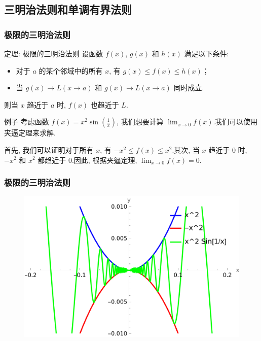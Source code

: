 \documentclass[
10pt,  
aspectratio=43,  
]{beamer}
\begin{document}
\subsection{三明治法则和单调有界法则}

\begin{frame}
	\frametitle{极限的三明治法则}
	
	\begin{block}{定理: 极限的三明治法则}
		设函数 $f(x)$,   $g(x)$ 和 $h(x)$ 满足以下条件: 
		\begin{itemize}
			\item 对于 $a$ 的某个邻域中的所有 $x$,  有 $g(x) \leq f(x) \leq h(x)$；
			\item 当 $g(x)\to L$$(x\to a)$ 和 $g(x)\to L$$(x\to a)$ 同时成立.
		\end{itemize}
		则当 $x$ 趋近于 $a$ 时,  $f(x)$ 也趋近于 $L$.
	\end{block}
	
	\begin{exampleblock}{例子}
		考虑函数 $f(x) = x^2 \sin\left(\frac{1}{x}\right)$,  我们想要计算 $\lim_{x \to 0} f(x)$.我们可以使用夹逼定理来求解.
		
		首先,  我们可以证明对于所有 $x$,  有 $-x^2 \leq f(x) \leq x^2$.其次,  当 $x$ 趋近于 $0$ 时,  $-x^2$ 和 $x^2$ 都趋近于 $0$.因此,  根据夹逼定理,  $\lim_{x \to 0} f(x) = 0$.
	\end{exampleblock}
	
\end{frame}

\begin{frame}
	\frametitle{极限的三明治法则}
	
	\begin{figure}
		\centering
		\includegraphics[width=1\linewidth]{sandwich.png}
		
		
	\end{figure}
\end{frame}
\end{document}
